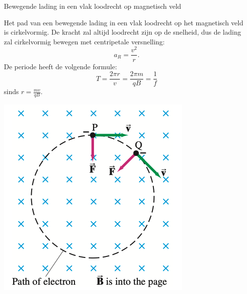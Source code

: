 \begin{app}{Bewegende lading in een vlak loodrecht op magnetisch veld}
    \begin{minipage}{.67\textwidth}
        Het pad van een bewegende lading in een vlak loodrecht op het magnetisch veld is cirkelvormig.
        De kracht zal altijd loodrecht zijn op de snelheid, dus de lading zal cirkelvormig bewegen met
        centripetale versnelling:
        \begin{equation*}
            a_{R} = \dfrac{v^2}{r}.
        \end{equation*}
        De periode heeft de volgende formule:
        \begin{equation*}
            T = \dfrac{2\pi r}{v} = \dfrac{2\pi m}{qB} = \dfrac{1}{f}
        \end{equation*}
        sinds $r = \tfrac{mv}{qB}$.
    \end{minipage}
    \begin{minipage}{.29\textwidth}
        \includegraphics[scale = 0.35]{Images/Magnetisme/CirkelvormigeBewegingMagentischVeld}
    \end{minipage}
\end{app}

\newpage

